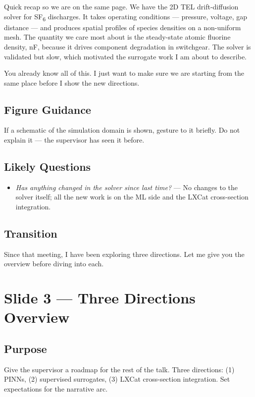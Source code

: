 \documentclass[12pt,a4paper]{article}
\begin{document}
Quick recap so we are on the same page. We have the 2D TEL
drift-diffusion solver for SF\textsubscript{6} discharges. It takes
operating conditions --- pressure, voltage, gap distance --- and
produces spatial profiles of species densities on a non-uniform mesh.
The quantity we care most about is the steady-state atomic fluorine
density, nF, because it drives component degradation in switchgear.
The solver is validated but slow, which motivated the surrogate work
I am about to describe.

You already know all of this. I just want to make sure we are
starting from the same place before I show the new directions.

\subsection*{Figure Guidance}
If a schematic of the simulation domain is shown, gesture to it
briefly. Do not explain it --- the supervisor has seen it before.

\subsection*{Likely Questions}
\begin{itemize}
  \item \emph{Has anything changed in the solver since last time?}
    --- No changes to the solver itself; all the new work is on the
    ML side and the LXCat cross-section integration.
\end{itemize}

\subsection*{Transition}
Since that meeting, I have been exploring three directions. Let me
give you the overview before diving into each.

\clearpage

\section{Slide 3 --- Three Directions Overview}
\label{sec:slide3}

\subsection*{Purpose}
Give the supervisor a roadmap for the rest of the talk. Three
directions: (1) PINNs, (2) supervised surrogates, (3) LXCat
cross-section integration. Set expectations for the narrative arc.
\end{document}

